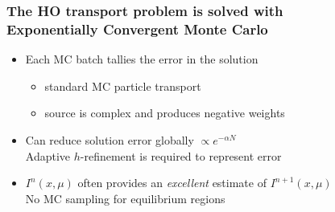 \documentclass[xcolor=dvipsnames,hyperref={pdfpagelabels=false},unknownkeysallowed]{beamer}
\newcommand{\colb}[1]{{\color{blue} #1}}
\newcommand{\colG}[1]{{\color{Gray!110} #1}}
\newcommand{\colr}[1]{{\color{red} #1}}
\newlength{\wideitemsep}
\let\olditem\item
\renewcommand{\item}{\setlength{\itemsep}{\wideitemsep}\olditem}
\begin{document}
{\addtolength\leftmargini{-0.165in}
\begin{frame}
    \frametitle{The HO transport problem is solved with \\ Exponentially Convergent Monte Carlo}
    \begin{itemize}
            \addtolength{\wideitemsep}{0.14in}
        \item[] Each MC batch tallies the \colb{error} in the solution 
            \begin{itemize}
                \item \colG{standard MC particle transport}
                    \vspace{-0.21in}
                \item \colG{source is \colr{complex} and produces negative weights}
    \end{itemize}

        \item[] Can reduce solution error \colb{globally} $\propto e^{-\alpha N}$ \\
            \colG{Adaptive $h$-refinement is required to represent error}
        \item[] $I^{n}(x,\mu)$ often provides an \emph{excellent} estimate of
            $I^{n+1}(x,\mu)$\\  \colG{No MC sampling for equilibrium regions}
     \end{itemize}
 \end{frame}
 }
\end{document}
